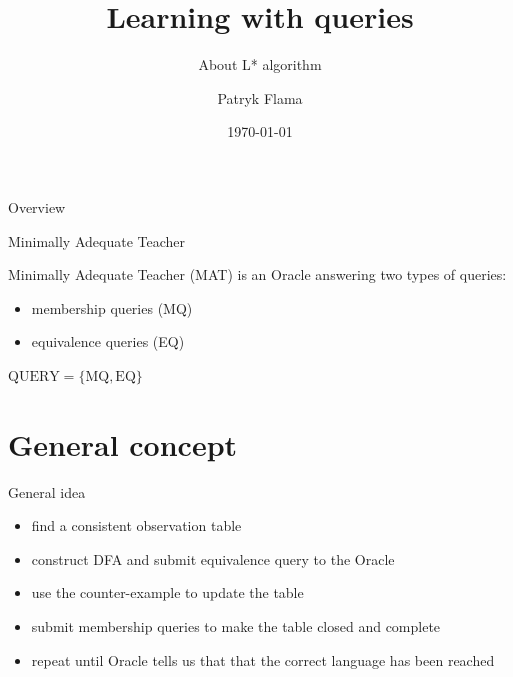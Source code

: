 \documentclass[aspectratio=169,xcolor=dvipsnames]{beamer}
\title{Learning with queries}
\subtitle{About L* algorithm}
\author{Patryk Flama}
\institute
{
    Department of Computer Science \\
    University of Wrocław
}
\date{\today}
\begin{document}
\begin{frame}
    \titlepage
\end{frame}



\begin{frame}{Overview}
    \tableofcontents
\end{frame}


\begin{frame}[t]{Minimally Adequate Teacher}


Minimally Adequate Teacher (MAT) is an Oracle answering two types of queries:  \\

\begin{itemize}
    \item membership queries (MQ)
    \item equivalence queries (EQ)
\end{itemize}

\vspace{3mm}

$\text{QUERY} = \{\text{MQ}, \text{EQ}\}$

\end{frame}


\section{General concept}

\begin{frame}[t]{General idea}
\begin{itemize}
    \item find a consistent observation table
    \item construct DFA and submit equivalence query to the Oracle
    \item use the counter-example to update the table
    \item submit membership queries to make the table closed and complete
    \item repeat until Oracle tells us that that the correct language has been reached
\end{itemize}

\end{frame}

\end{document}
